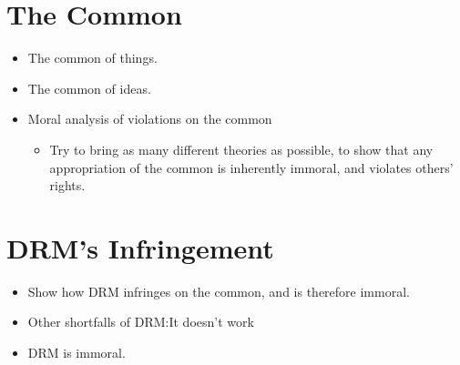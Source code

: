 \documentclass[12pt,letterpaper]{article}
\begin{document}
\section{The Common}
\begin{itemize}
    \item The common of things.\autocite{locke-1988}
    \item The common of ideas.\autocite{locke-1988}\autocite{gordon-1993}\autocite{hegel-1991}
    \item Moral analysis of violations on the common
    \begin{itemize}
        \item Try to bring as many different theories as possible, to show that any appropriation of the common is inherently immoral, and violates others' rights.
    \end{itemize}
\end{itemize}
\section{DRM's Infringement}
\begin{itemize}
    \item Show how DRM infringes on the common, and is therefore immoral.\autocite{favale-2014}\autocite{gordon-1993}
    \item Other shortfalls of DRM:\@ It doesn't work\autocite{favale-2014}
    \item DRM is immoral.
\end{itemize}
\newpage
\printbibliography[heading=bibintoc,title={Bibliography}]
\end{document}
